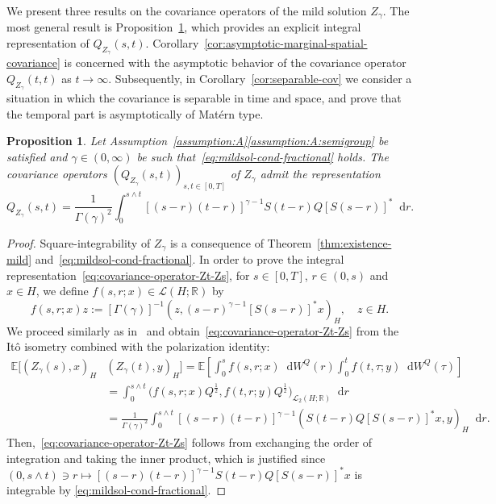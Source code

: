 \documentclass[reqno]{amsart}
\numberwithin{equation}{section}
\newcommand{\R}{\mathbb{R}}
\newcommand{\E}{\mathbb{E}}
\newcommand{\rd}{\mathop{}\!\mathrm{d}}
\newtheorem{proposition}[lemma]{Proposition}
\theoremstyle{remark}
\theoremstyle{definition}
\begin{document}
We present three results on the covariance operators
of the mild solution $Z_\gamma$. 
The most general result is
Proposition~\ref{prop:covariance-mild-solution},
which provides an explicit 
integral representation of $Q_{Z_\gamma}(s,t)$. 
%
Corollary~\ref{cor:asymptotic-marginal-spatial-covariance} 
is concerned with the asymptotic behavior of the covariance 
operator $Q_{Z_\gamma}(t,t)$ as $t\to\infty$. 
Subsequently, in Corollary~\ref{cor:separable-cov} 
we consider 
a situation in which the covariance is separable 
in time and space, 
and prove that the temporal part is asymptotically
of Mat\'ern type.

\begin{proposition}\label{prop:covariance-mild-solution}
	Let 
	Assumption~\textup{\ref{assumption:A}\ref{assumption:A:semigroup}} 
	be satisfied and $\gamma \in (0,\infty)$ be such that~\eqref{eq:mildsol-cond-fractional} holds.
	The covariance operators $(Q_{Z_\gamma}(s,t))_{s,t\in[0,T]}$ 
	of $Z_\gamma$ admit 
	the representation 
	\begin{equation}\label{eq:covariance-operator-Zt-Zs}
	Q_{Z_\gamma}(s,t) 
	= 
	\frac{1}{\Gamma(\gamma)^2}
	\int_0^{s\wedge t}
	[(s-r)(t-r)]^{\gamma-1} S(t-r) Q [S(s-r)]^*
	\rd r. 
	\end{equation}
\end{proposition}
%
\begin{proof}
	Square-integrability of $Z_\gamma$ 
	is a consequence of Theorem~\ref{thm:existence-mild} 
	and~\eqref{eq:mildsol-cond-fractional}. 
	In order to prove 
	the integral representation~\eqref{eq:covariance-operator-Zt-Zs}, 
	for $s\in[0,T]$, $r\in(0,s)$ and $x\in H$, we 
	define $f(s,r;x) \in \mathscr L(H;\R)$ by 
	\[
	f(s,r;x) z 
	:= 
	[\Gamma(\gamma)]^{-1} 
	(z, (s-r)^{\gamma-1} [S(s-r)]^* x)_H, 
	\quad 
	z\in H. 
	\]
	We proceed 
	similarly as in~\cite[Lemma~3.10]{KirchnerLangLarsson2017} 
	and obtain~\eqref{eq:covariance-operator-Zt-Zs}  
	from the It\^o isometry combined with the 
	polarization identity: 
	\begin{align*}
	\E[ (Z_\gamma(s), x)_H &( Z_\gamma(t), y)_H ] 
	= 
	\E\left[  
	\int_0^s f(s,r;x) \rd W^Q(r)  
	\int_0^t  f(t,\tau;y) \rd W^Q(\tau) 
	\right] 
	\\
	&= 
	\int_0^{s\wedge t} 
	\bigl( 
	f(s,r;x) Q^{\frac{1}{2}}, 
	f(t,r;y) Q^{\frac{1}{2}} 
	\bigr)_{\mathscr L_2(H;\R)} \rd r 
	\\
	&= 
	\frac{1}{\Gamma(\gamma)^2} 
	\int_0^{s\wedge t} 
	[(s-r)(t-r)]^{\gamma-1} 
	( S(t-r) Q [S(s-r)]^* x, y )_H 
	\rd r . 
	\end{align*}
	Then,~\eqref{eq:covariance-operator-Zt-Zs} follows 
	from exchanging the order of integration 
	and taking the inner product, 
	which is justified since 
	$(0,s\wedge t)\ni r \mapsto [(s-r)(t-r)]^{\gamma-1} 
	S(t-r) Q [S(s-r)]^* x$ is integrable 
	by \eqref{eq:mildsol-cond-fractional}. 
\end{proof}
\end{document}
